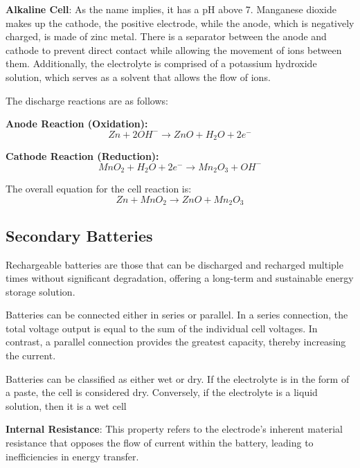 \documentclass{article}
\begin{document}
\begin{flushleft}
\textbf{Alkaline Cell}: As the name implies, it has a pH above 7. Manganese dioxide makes up the cathode, the positive electrode, while the anode, which is negatively charged, is made of zinc metal. There is a separator between the anode and cathode to prevent direct contact while allowing the movement of ions between them. Additionally, the electrolyte is comprised of a potassium hydroxide solution, which serves as a solvent that allows the flow of ions.

The discharge reactions are as follows:

\textbf{Anode Reaction (Oxidation):}
\begin{equation*}
    Zn + 2OH^- \rightarrow ZnO + H_2O + 2e^-
\end{equation*}

\textbf{Cathode Reaction (Reduction):}
\begin{equation*}
    MnO_2 + H_2O + 2e^- \rightarrow Mn_2O_3 + OH^-
\end{equation*}

The overall equation for the cell reaction is:
\begin{equation*}
    Zn + MnO_2 \rightarrow ZnO + Mn_2O_3
\end{equation*}

\subsection*{Secondary Batteries}

Rechargeable batteries are those that can be discharged and recharged multiple times without significant degradation, offering a long-term and sustainable energy storage solution. \newline

Batteries can be connected either in series or parallel. 
In a series connection, the total voltage output is equal to the sum of the individual cell voltages. In contrast, a parallel connection provides the greatest capacity, thereby increasing the current. \newline

Batteries can be classified as either wet or dry. If the electrolyte is in the form of a paste, the cell is considered dry. Conversely, if the electrolyte is a liquid solution, then it is a wet cell
\newline
\vspace*{3pt}

\textbf{Internal Resistance}: This property refers to the electrode's inherent material resistance that opposes the flow of current within the battery, leading to inefficiencies in energy transfer. \newline


\end{flushleft}
\end{document}
